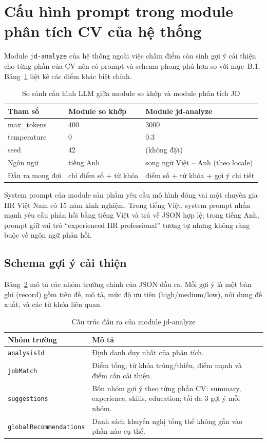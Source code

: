 \documentclass[../DoAn.tex]{subfiles}
\begin{document}
\section{Cấu hình prompt trong module phân tích CV của hệ thống}

Module \texttt{jd-analyze} của hệ thống ngoài việc chấm điểm còn sinh gợi ý cải thiện cho từng phần của CV nên có prompt và schema phong phú hơn so với mục~B.1. Bảng~\ref{tab:llm-compare} liệt kê các điểm khác biệt chính.

\begin{table}[H]
\centering
\caption{So sánh cấu hình LLM giữa module so khớp và module phân tích JD}
\label{tab:llm-compare}
\begin{tabular}{|l|l|l|}
\hline
\textbf{Tham số} & \textbf{Module so khớp} & \textbf{Module jd-analyze} \\
\hline
max\_tokens & 400 & 3000 \\
\hline
temperature & 0 & 0.3 \\
\hline
seed & 42 & (không đặt) \\
\hline
Ngôn ngữ & tiếng Anh & song ngữ Việt -- Anh (theo locale) \\
\hline
Đầu ra mong đợi & chỉ điểm số + từ khóa & điểm số + từ khóa + gợi ý chi tiết \\
\hline
\end{tabular}
\end{table}

System prompt của module sản phẩm yêu cầu mô hình đóng vai một chuyên gia HR Việt Nam có 15 năm kinh nghiệm. Trong tiếng Việt, system prompt nhấn mạnh yêu cầu phản hồi bằng tiếng Việt và trả về JSON hợp lệ; trong tiếng Anh, prompt giữ vai trò ``experienced HR professional'' tương tự nhưng không ràng buộc về ngôn ngữ phản hồi.

\subsection{Schema gợi ý cải thiện}

Bảng~\ref{tab:jd-analyze-schema} mô tả các nhóm trường chính của JSON đầu ra. Mỗi gợi ý là một bản ghi (record) gồm tiêu đề, mô tả, mức độ ưu tiên (high/medium/low), nội dung đề xuất, và các từ khóa liên quan.

\begin{table}[H]
\centering
\caption{Cấu trúc đầu ra của module jd-analyze}
\label{tab:jd-analyze-schema}
\begin{tabular}{|l|p{9cm}|}
\hline
\textbf{Nhóm trường} & \textbf{Mô tả} \\
\hline
\texttt{analysisId} & Định danh duy nhất của phân tích. \\
\hline
\texttt{jobMatch} & Điểm tổng, từ khóa trùng/thiếu, điểm mạnh và điểm cần cải thiện. \\
\hline
\texttt{suggestions} & Bốn nhóm gợi ý theo từng phần CV: summary, experience, skills, education; tối đa 3 gợi ý mỗi nhóm. \\
\hline
\texttt{globalRecommendations} & Danh sách khuyến nghị tổng thể không gắn vào phần nào cụ thể. \\
\hline
\end{tabular}
\end{table}
\end{document}

